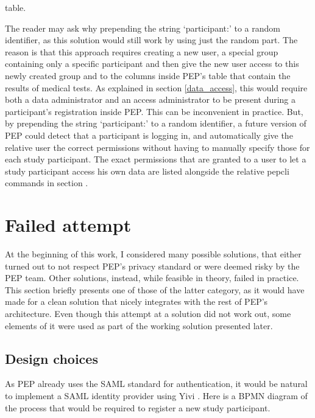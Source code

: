 \documentclass{report}
\begin{document}
table. \par
The reader may ask why prepending the string \enquote*{participant:} to a random identifier, as this solution would still work by using just the random part. The reason is that
this approach requires creating a new user, a special group containing only a specific participant and then give the new user access to this newly created group and to the columns
inside PEP's table that contain the results of medical tests. As explained in section \ref{data_access}, this would require both a data administrator and an access administrator to
be present during a participant's registration inside PEP. This can be inconvenient in practice. But, by prepending the string \enquote*{participant:} to a random identifier, a
future version of PEP
could detect that a participant is logging in, and automatically give the relative user the correct permissions without having to manually specify those for each study participant.
The exact permissions that are granted to a user to let a study participant access his own data are listed alongside the relative pepcli commands in section .

\section{Failed attempt}
At the beginning of this work, I considered many possible solutions, that either turned out to not respect PEP's privacy standard or were deemed risky by the PEP team. Other
solutions, instead, while feasible in theory, failed in practice. This section briefly presents one of those of the latter category, as it would have made for a clean solution that
nicely integrates with the rest of PEP's architecture. Even though this attempt at a solution did not work out, some elements of it were used as part of the working solution
presented later.\par

\subsection{Design choices}
As PEP already uses the SAML standard \cite{sstc-saml-core-errata-2.0-wd-07} for authentication, it would be natural to implement a SAML identity provider using Yivi \cite{irma-app}.
Here is a BPMN diagram of the process that would be required to register a new study participant.
\end{document}
